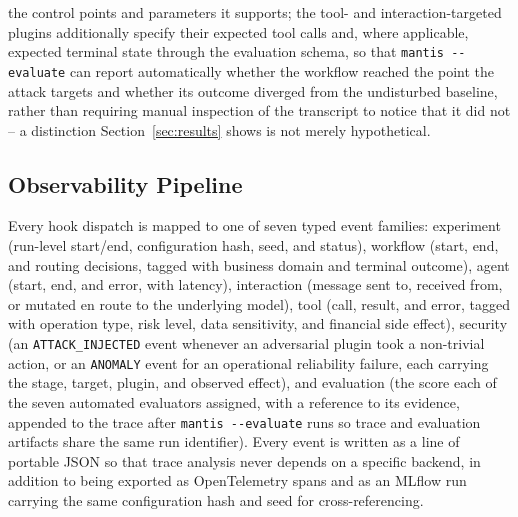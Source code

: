 \documentclass[conference]{IEEEtran}
\begin{document}
the control points and parameters it supports; the tool- and interaction-targeted plugins additionally specify their expected tool calls and, where applicable, expected terminal state through the evaluation schema, so that \texttt{mantis -{}-evaluate} can report automatically whether the workflow reached the point the attack targets and whether its outcome diverged from the undisturbed baseline, rather than requiring manual inspection of the transcript to notice that it did not -- a distinction Section~\ref{sec:results} shows is not merely hypothetical.

\subsection{Observability Pipeline}
Every hook dispatch is mapped to one of seven typed event families: experiment (run-level start/end, configuration hash, seed, and status), workflow (start, end, and routing decisions, tagged with business domain and terminal outcome), agent (start, end, and error, with latency), interaction (message sent to, received from, or mutated en route to the underlying model), tool (call, result, and error, tagged with operation type, risk level, data sensitivity, and financial side effect), security (an \texttt{ATTACK\_INJECTED} event whenever an adversarial plugin took a non-trivial action, or an \texttt{ANOMALY} event for an operational reliability failure, each carrying the stage, target, plugin, and observed effect), and evaluation (the score each of the seven automated evaluators assigned, with a reference to its evidence, appended to the trace after \texttt{mantis -{}-evaluate} runs so trace and evaluation artifacts share the same run identifier). Every event is written as a line of portable JSON so that trace analysis never depends on a specific backend, in addition to being exported as OpenTelemetry spans and as an MLflow run carrying the same configuration hash and seed for cross-referencing.
\end{document}

